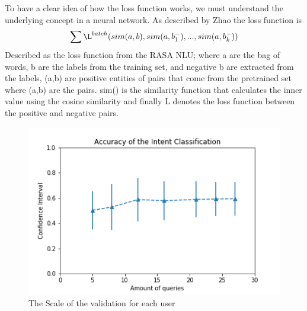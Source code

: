 To have a clear idea of how the loss function works, we must understand the underlying concept in a neural network. As described by Zhao \cite{lossFunction} the loss function is 
\begin{equation}
    \sum \L ^{batch}(sim(a,b), sim(a, b_{1}^{-}),...,sim(a,b_{k}^{-}))
\end{equation}{Described as the loss function from the RASA NLU; where a are the bag of words, b are the labels from the training set, and negative b are extracted from the labels, (a,b) are positive entities of pairs that come from the pretrained set where (a,b) are the pairs. sim() is the similarity function that calculates the inner value using the cosine similarity and finally L denotes the loss function between the positive and negative pairs.}
\begin{figure}[!h]
    \centering
    \includegraphics[scale=0.65]{MA-BA-Thesis/AccuracyValidation.png}
    \caption{The Scale of the validation for each user}
    \label{fig:accuracyValidation}
\end{figure}


